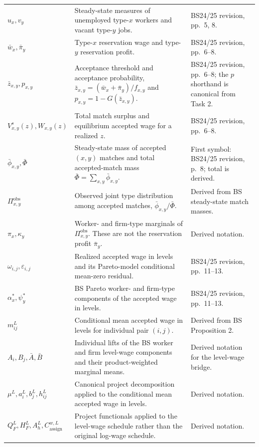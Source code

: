 \documentclass[11pt]{article}
\begin{document}
\begin{longtable}{p{}p{}p{}}
\(u_x,v_y\) & Steady-state measures of unemployed type-\(x\) workers and
vacant type-\(y\) jobs. & BS24/25 revision, pp.\ 5, 8. \\
\(\bar w_x,\bar\pi_y\) & Type-\(x\) reservation wage and type-\(y\)
reservation profit. & BS24/25 revision, pp.\ 6--8. \\
\(\bar z_{x,y},p_{x,y}\) & Acceptance threshold and acceptance probability,
\(\bar z_{x,y}=(\bar w_x+\bar\pi_y)/f_{x,y}\) and
\(p_{x,y}=1-G(\bar z_{x,y})\). & BS24/25 revision, pp.\ 6--8; the \(p\)
shorthand is canonical from Task 2. \\
\(V^s_{x,y}(z),W_{x,y}(z)\) & Total match surplus and equilibrium accepted
wage for a realized \(z\). & BS24/25 revision, pp.\ 6--8. \\
\(\bar\phi_{x,y},\bar\Phi\) & Steady-state mass of accepted \((x,y)\)
matches and total accepted-match mass
\(\bar\Phi=\sum_{x,y}\bar\phi_{x,y}\). & First symbol: BS24/25 revision,
p.\ 8; total is derived. \\
\(\Pi^{\mathrm{obs}}_{x,y}\) & Observed joint type distribution among
accepted matches, \(\bar\phi_{x,y}/\bar\Phi\). & Derived from BS steady-state
match masses. \\
\(\pi_x,\kappa_y\) & Worker- and firm-type marginals of
\(\Pi^{\mathrm{obs}}_{x,y}\).  These are not the reservation profit
\(\bar\pi_y\). & Derived notation. \\
\(\omega_{i,j},\varepsilon_{i,j}\) & Realized accepted wage in levels and
its Pareto-model conditional mean-zero residual. & BS24/25 revision,
pp.\ 11--13. \\
\(\alpha_x^*,\psi_y^*\) & BS Pareto worker- and firm-type components of the
accepted wage in levels. & BS24/25 revision, pp.\ 11--13. \\
\(m^{L}_{ij}\) & Conditional mean accepted wage in levels for individual
pair \((i,j)\). & Derived from BS Proposition 2. \\
\(A_i,B_j,\bar A,\bar B\) & Individual lifts of the BS worker and firm
level-wage components and their product-weighted marginal means. & Derived
notation for the level-wage bridge. \\
\(\mu^L,a_i^L,b_j^L,h_{ij}^L\) & Canonical project decomposition applied to
the conditional mean accepted wage in levels. & Derived notation. \\
\(Q_F^L,H_F^L,A_h^L,C_{\mathrm{assign}}^{w,L}\) & Project functionals applied
to the level-wage schedule rather than the original log-wage schedule. &
Derived notation. \\

\end{longtable}
\end{document}
